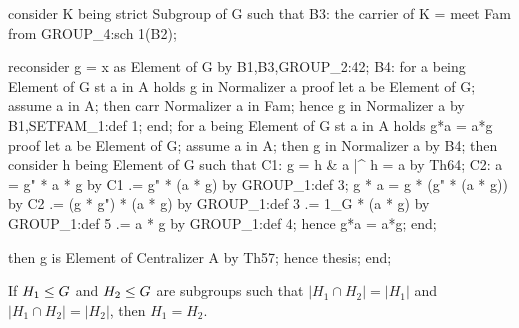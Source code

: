   consider K being strict Subgroup of G such that
  B3: the carrier of K = meet Fam
  from GROUP_4:sch 1(B2);

  reconsider g = x as Element of G by B1,B3,GROUP_2:42;
  B4: for a being Element of G st a in A
  holds g in Normalizer a
  proof
    let a be Element of G;
    assume a in A;
    then carr Normalizer a in Fam;
    hence g in Normalizer a by B1,SETFAM_1:def 1;
  end;
  for a being Element of G st a in A holds g*a = a*g
  proof
    let a be Element of G;
    assume a in A;
    then g in Normalizer a by B4;
    then consider h being Element of G such that
    C1: g = h & a |^ h = a
    by Th64;
    C2: a = g" * a * g by C1
         .= g" * (a * g) by GROUP_1:def 3;
    g * a = g * (g" * (a * g)) by C2
         .= (g * g") * (a * g) by GROUP_1:def 3
         .= 1_G * (a * g) by GROUP_1:def 5
         .= a * g by GROUP_1:def 4;
    hence g*a = a*g;
  end;

  then g is Element of Centralizer A by Th57;
  hence thesis;
end;
\nwendcode{}\nwdocspar



\begin{theorem}
If $H_{1}\leq G$ and $H_{2}\leq G$ are subgroups such that
$|H_{1}\cap H_{2}|=|H_{1}|$ and $|H_{1}\cap H_{2}|=|H_{2}|$, then $H_{1}=H_{2}$.
\end{theorem}

